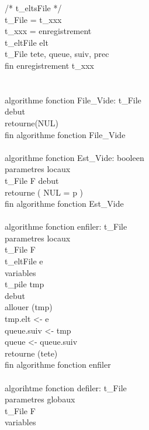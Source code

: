 \documentclass [11pt]{report}
\begin{document}
/* t\_eltsFile */ \\
\indent \indent t\_File = \textuparrow t\_xxx \\
\indent \indent t\_xxx = enregistrement \\
\indent \indent \indent t\_eltFile elt \\
\indent \indent \indent t\_File tete, queue, suiv, prec\\
\indent \indent fin enregistrement t\_xxx\\
\\
\\
algorithme fonction File\_Vide: t\_File \\
debut\\
\indent retourne(NUL)\\
fin algorithme fonction File\_Vide\\
\\
algorithme fonction Est\_Vide: booleen\\
\indent parametres locaux \\
\indent \indent t\_File F
debut \\
\indent retourne ( NUL = p )\\
fin algorithme fonction Est\_Vide\\
\\
			algorithme fonction enfiler: t\_File\\
\indent 		parametres locaux \\
\indent \indent 	t\_File F \\
\indent \indent 	t\_eltFile e\\
\indent 		variables \\
\indent \indent 	t\_pile tmp\\
			debut\\
\indent			allouer (tmp)\\
\indent 		tmp\textuparrow.elt <- e\\
\indent 		queue\textuparrow.suiv <- tmp\\
\indent 		queue <- queue\textuparrow.suiv\\
\indent 		retourne (tete)\\
			fin algorithme fonction enfiler\\
\\
\newpage
						algorihtme fonction defiler: t\_File \\
\indent				 		parametres globaux\\
\indent \indent			 		t\_File F \\
\indent				 		variables \\
\end{document}

